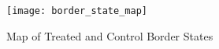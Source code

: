 \begin{figure}[H]
    \centering
    \texttt{[image: border\_state\_map]}
    \caption{Map of Treated and Control Border States}
    \label{fig:border-state-map}
\end{figure}